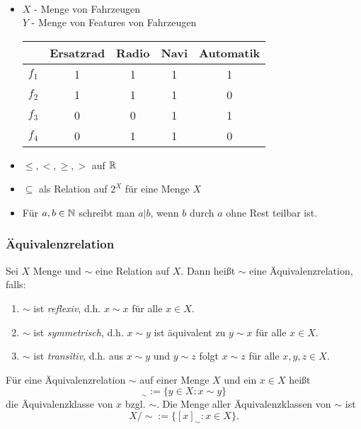 \begin{bsp}\ %
\begin{itemize}
	\item $ X $ - Menge von Fahrzeugen\\
	$ Y $ - Menge von Features von Fahrzeugen

	\begin{tabular}{l|c|c|c|c}
		& Ersatzrad & Radio & Navi & Automatik \\
		\hline
		$ f_1 $ & 1 & 1 & 1 & 1 \\
		$ f_2 $ & 1 & 1 & 1 & 0 \\
		$ f_3 $ & 0 & 0 & 1 & 1 \\
		$ f_4 $ & 0 & 1 & 1 & 0
	\end{tabular}
	\item $ \leq, <, \geq, > $ auf $ \mathbb R $
	\item $ \subseteq $ als Relation auf $ 2^X $ für eine Menge $ X $
	\item Für $ a,b \in \mathbb N $ schreibt man $ a | b $, wenn $ b $ durch $ a $ ohne Rest teilbar ist.
\end{itemize}
\end{bsp}

\subsubsection{Äquivalenzrelation}

Sei $ X $ Menge und $ \sim $ eine Relation auf $ X $. Dann heißt $ \sim $ eine Äquivalenzrelation, falls:
\begin{enumerate}
	\item $ \sim $ ist \emph{reflexiv}, d.h. $ x \sim x $ für alle $ x \in X $.
	\item $ \sim $ ist \emph{symmetrisch}, d.h. $ x \sim y $ ist äquivalent zu $ y \sim x $ für alle $ x \in X $.
	\item $ \sim $ ist \emph{transitiv}, d.h. aus $ x \sim y $ und $ y \sim z $ folgt $ x \sim z $ für alle $ x,y,z \in X $.
\end{enumerate}
Für eine Äquivalenzrelation $ \sim $ auf einer Menge $ X $ und ein $ x \in X $ heißt
\begin{equation*}
	[x]_\sim := \{ y \in X : x \sim y \}
\end{equation*}
die Äquivalenzklasse von $ x $ bzgl. $ \sim $. Die Menge aller Äquivalenzklassen von $ \sim $ ist
\begin{equation*}
	X/{\sim} := \{ [x]_\sim : x \in X \}. %
\end{equation*}

